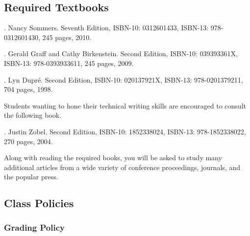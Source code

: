 \subsection*{Required Textbooks}


  . Nancy Sommers. Seventh Edition,  ISBN-10: 0312601433, ISBN-13: 978-0312601430,
  245 pages, 2010.


  . Gerald Graff and Cathy Birkenstein. Second Edition,  
  ISBN-10: 039393361X, ISBN-13: 978-0393933611, 245 pages, 2009.


. Lyn Dupr\'e. Second Edition,  ISBN-10: 020137921X,
ISBN-13: 978-0201379211, 704 pages, 1998.

\noindent
Students wanting to hone their technical writing skills are encouraged to consult the following book.

.  Justin Zobel. Second Edition,  ISBN-10: 1852338024, ISBN-13:
978-1852338022, 270 pages, 2004.

\noindent 
Along with reading the required books, you will be asked to study many additional articles from a wide variety of
conference proceedings, journals, and the popular press.


\subsection*{Class Policies}

\subsubsection*{Grading Policy}

